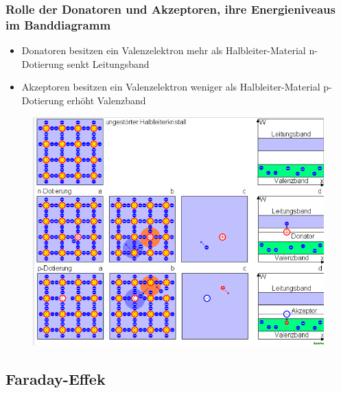 \subsubsection*{Rolle der Donatoren und Akzeptoren, ihre Energieniveaus im Banddiagramm}
\begin{itemize}
    \item Donatoren besitzen ein Valenzelektron mehr als Halbleiter-Material
        \to n-Dotierung
        \to senkt Leitungsband
    \item Akzeptoren besitzen ein Valenzelektron weniger als Halbleiter-Material
        \to p-Dotierung 
        \to erhöht Valenzband
\end{itemize}
\begin{figure}[H]
    \centering
    \includegraphics[scale=0.5]{pictures/Dotierung.png}
    \caption{\cite{Dotierung}}
\end{figure}

\subsection{Faraday-Effek}
